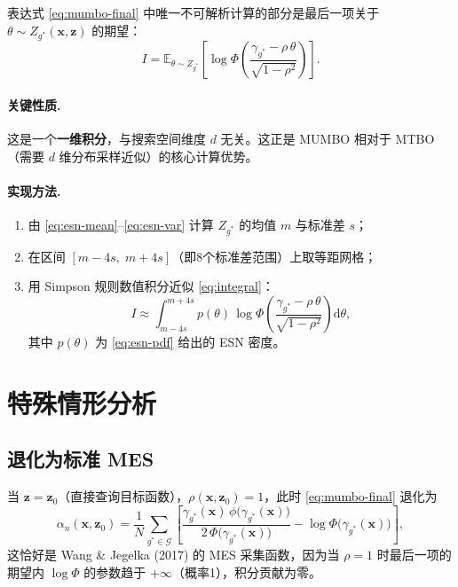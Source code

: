 \documentclass[11pt,a4paper]{article}
\newcommand{\bx}{\mathbf{x}}
\newcommand{\bz}{\mathbf{z}}
\begin{document}
表达式 \eqref{eq:mumbo-final} 中唯一不可解析计算的部分是最后一项关于 $\theta\sim Z_{g^*}(\bx,\bz)$ 的期望：
\begin{equation}\label{eq:integral}
  I = \mathbb{E}_{\theta\sim Z_{g^*}}\!\left[\log\Phi\!\left(\frac{\gamma_{g^*}-\rho\,\theta}{\sqrt{1-\rho^2}}\right)\right].
\end{equation}

\paragraph{关键性质.} 这是一个\textbf{一维积分}，与搜索空间维度 $d$ 无关。这正是 MUMBO 相对于 MTBO（需要 $d$ 维分布采样近似）的核心计算优势。

\paragraph{实现方法.}
\begin{enumerate}[nosep]
  \item 由 \eqref{eq:esn-mean}--\eqref{eq:esn-var} 计算 $Z_{g^*}$ 的均值 $m$ 与标准差 $s$；
  \item 在区间 $[m-4s,\;m+4s]$（即8个标准差范围）上取等距网格；
  \item 用 Simpson 规则数值积分近似 \eqref{eq:integral}：
  \[
    I \approx \int_{m-4s}^{m+4s} p(\theta)\,\log\Phi\!\left(\frac{\gamma_{g^*}-\rho\,\theta}{\sqrt{1-\rho^2}}\right)\mathrm{d}\theta,
  \]
  其中 $p(\theta)$ 为 \eqref{eq:esn-pdf} 给出的 ESN 密度。
\end{enumerate}

\section{特殊情形分析}

\subsection{退化为标准 MES}

当 $\bz=\bz_0$（直接查询目标函数），$\rho(\bx,\bz_0)=1$，此时 \eqref{eq:mumbo-final} 退化为
\begin{equation}
  \alpha_n(\bx,\bz_0) = \frac{1}{N}\sum_{g^*\in\mathcal{G}}\left[
    \frac{\gamma_{g^*}(\bx)\,\phi\!\bigl(\gamma_{g^*}(\bx)\bigr)}{2\,\Phi\!\bigl(\gamma_{g^*}(\bx)\bigr)}
    - \log\Phi\!\bigl(\gamma_{g^*}(\bx)\bigr)
  \right],
\end{equation}
这恰好是 Wang \& Jegelka (2017) 的 MES 采集函数，因为当 $\rho=1$ 时最后一项的期望内 $\log\Phi$ 的参数趋于 $+\infty$（概率1），积分贡献为零。
\end{document}

